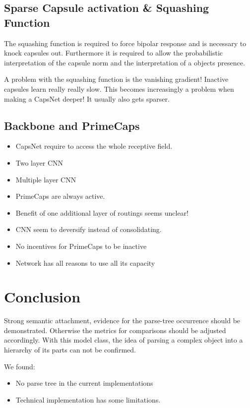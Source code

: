 \documentclass{article}
\begin{document}
\subsection{Sparse Capsule activation \& Squashing Function}
The squashing function is required to force bipolar response and is necessary to knock capsules out. Furthermore it is required to allow the probabilistic interpretation of the capsule norm and the interpretation of a objects presence.

A problem with the squashing function is the vanishing gradient!
Inactive capsules learn really really slow. This becomes increasingly a problem when making a CapsNet deeper! It usually also gets sparser.

\subsection{Backbone and PrimeCaps}
\begin{itemize}
	\item CapsNet require to access the whole receptive field.
	\item Two layer CNN
	\item Multiple layer CNN
	\item PrimeCaps are always active.
	\item Benefit of one additional layer of routings seems unclear!
	\item CNN seem to deversify instead of consolidating.
	\item No incentives for PrimeCaps to be inactive
	\item Network has all reasons to use all its capacity
\end{itemize}

\section{Conclusion}

Strong semantic attachment, evidence for the parse-tree occurrence should be demonstrated. Otherwise the metrics for comparisons should be adjusted accordingly.
With this model class, the idea of parsing a complex object into a hierarchy of its parts can not be confirmed.

We found:
\begin{itemize}
	\item No parse tree in the current implementations
	\item Technical implementation has some limitations.
\end{itemize}
\end{document}
